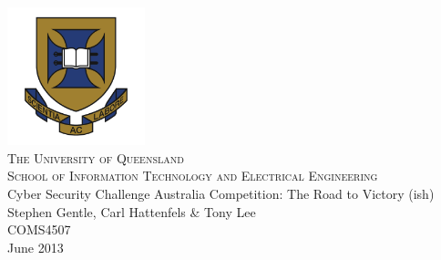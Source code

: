 \documentclass[11pt,a4paper,twoside,openright]{book}
\begin{document}
\frontmatter

\begin{titlepage}
\begin{center}
\includegraphics[width=0.3\textwidth]{images/UQLogo}\\[0.3cm]

\textsc{\LARGE The University of Queensland}\\[0.4cm]

\textsc{\Large School of Information Technology and Electrical Engineering}\\[2cm]

{\huge Cyber Security Challenge Australia Competition: The Road to Victory (ish)}\\[1.8cm]

{\Large Stephen Gentle, Carl Hattenfels & Tony Lee}\\[1.5cm]
{\large COMS4507}\\[0.5cm]
{\large June 2013}\\[5.4cm]

\end{center}

\end{titlepage}

\cleardoublepage



\tableofcontents
\listoffigures
\listoftables

\mainmatter


\clearpage
{}

\end{document}
